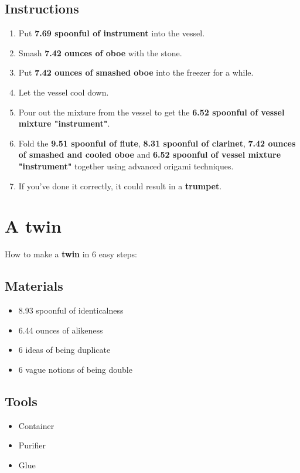 \documentclass{article}
\begin{document}
\subsection{Instructions}\begin{enumerate}
\item 
Put \textbf{7.69 spoonful of instrument} into the vessel.
\item 
Smash \textbf{7.42 ounces of oboe} with the stone.
\item 
Put \textbf{7.42 ounces of smashed oboe} into the freezer for a while.
\item 
Let the vessel cool down.
\item 
Pour out the mixture from the vessel to get the \textbf{6.52 spoonful of vessel mixture "instrument"}.
\item 
Fold the \textbf{9.51 spoonful of flute}, \textbf{8.31 spoonful of clarinet}, \textbf{7.42 ounces of smashed and cooled oboe} and \textbf{6.52 spoonful of vessel mixture "instrument"} together using advanced origami techniques.
\item 
If you've done it correctly, it could result in a \textbf{trumpet}.
\end{enumerate}
\newpage
\section{A twin}How to make a \textbf{twin} in 6 easy steps:

\subsection{Materials}\begin{itemize}
\item 
8.93 spoonful of identicalness
\item 
6.44 ounces of alikeness
\item 
6 ideas of being duplicate
\item 
6 vague notions of being double
\end{itemize}
\subsection{Tools}\begin{itemize}
\item 
Container
\item 
Purifier
\item 
Glue
\end{itemize}
\end{document}
